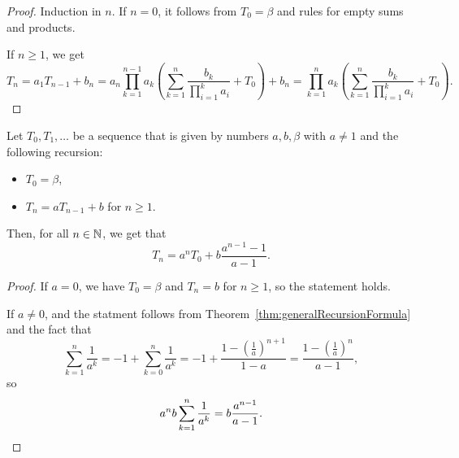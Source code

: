 \documentclass[language=english]{../../Template/TemplateLecture}
\begin{document}
\begin{proof}
    Induction in $n$. If $n = 0$, it follows from $T_0 = \beta$ and rules for empty sums and products.

    If $n \geq 1$, we get 
    \begin{equation}
        T_n = a_1 T_{n-1} + b_n = a_n \prod_{k = 1}^{n-1} a_k \left( \sum_{k = 1}^n \frac{b_k}{\prod_{i = 1}^k a_i} + T_0 \right) + b_n = \prod_{k = 1}^n a_k \left( \sum_{k = 1}^n \frac{b_k}{\prod_{i = 1}^k a_i} + T_0 \right).
    \end{equation}
\end{proof}

\begin{corollary}
    Let $T_0, T_1, \ldots$ be a sequence that is given by numbers $a, b, \beta$ with $a \neq 1$ and the following recursion:
    \begin{itemize}
        \item $T_0 = \beta$,
        \item $T_n = a T_{n-1} + b$ for $n \geq 1$.
    \end{itemize}
    Then, for all $n \in \mathbb{N}$, we get that 
    \begin{equation}
        T_n = a^n T_0 + b\frac{a^{n-1} - 1}{a-1}.
    \end{equation}
\end{corollary}

\begin{proof}
    If $a = 0$, we have $T_0 = \beta$ and $T_n = b$ for $n \geq 1$, so the statement holds.

    If $a \neq 0$, and the statment follows from Theorem~\ref{thm:generalRecursionFormula} and the fact that 
    \begin{equation}
         \sum_{k = 1}^n \frac{1}{a^k} = -1 + \sum_{k = 0}^n \frac{1}{a^k} = -1 + \frac{1 - \left( \frac{1}{a} \right)^{n+1}}{1-a} = \frac{1-\left( \frac{1}{a} \right)^n}{a-1},
    \end{equation} 
    so 
    \begin{equation}
        a^n b \sum_{k = 1}^n \frac{1}{a^k} = b\frac{a^{n-1}}{a-1}.\qedhere
    \end{equation}
\end{proof}
\end{document}
